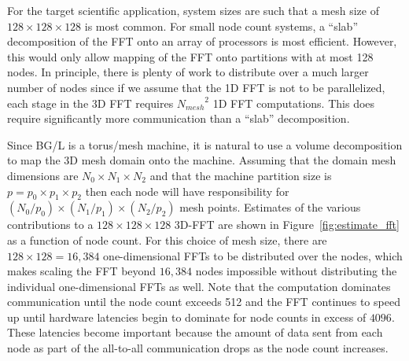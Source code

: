 \documentclass[doublespacing]{elsart}
\newcommand{\nodecount}{\ensuremath{p}}
\newcommand{\meshsize}[1]{\ensuremath{N_{#1}}}
\newcommand{\nodemeshsize}[1]{\ensuremath{\nodecount_{#1}}}
\begin{document}
For the target scientific application, system sizes are such that a
mesh size of $128\times 128\times 128$ is most common.  For small node
count systems, a ``slab'' decomposition of the FFT onto an array of
processors is most efficient.  However, this would only allow mapping
of the FFT onto partitions with at most 128 nodes.  In principle,
there is plenty of work to distribute over a much larger number of
nodes since if we assume that the 1D FFT is not to be parallelized,
each stage in the 3D FFT requires $\meshsize{mesh}^2$ 1D FFT
computations.  This does require significantly more communication than
a ``slab'' decomposition.

Since BG/L is a torus/mesh machine, it is natural to use a volume
decomposition to map the 3D mesh domain onto the machine.  Assuming
that the domain mesh dimensions are $\meshsize{0}\times
\meshsize{1}\times\meshsize{2}$ and that the machine partition size is
$p=p_0\times p_1\times p_2$ then each node will have responsibility
for $(\meshsize{0}/\nodemeshsize{0})\times
(\meshsize{1}/\nodemeshsize{1})\times (\meshsize{2}/\nodemeshsize{2})$
mesh points.  Estimates of the various contributions to a $128\times
128\times 128$ 3D-FFT are shown in Figure~\ref{fig:estimate_fft} as a
function of node count.  For this choice of mesh size, there are
$128\times 128=16,384$ one-dimensional FFTs to be distributed over the
nodes, which makes scaling the FFT beyond $16,384$ nodes impossible
without distributing the individual one-dimensional FFTs as well.
Note that the computation dominates communication until the node count
exceeds 512 and the FFT continues to speed up until hardware latencies
begin to dominate for node counts in excess of $4096$.  These
latencies become important because the amount of data sent from each
node as part of the all-to-all communication drops as the node count
increases.
\end{document}
